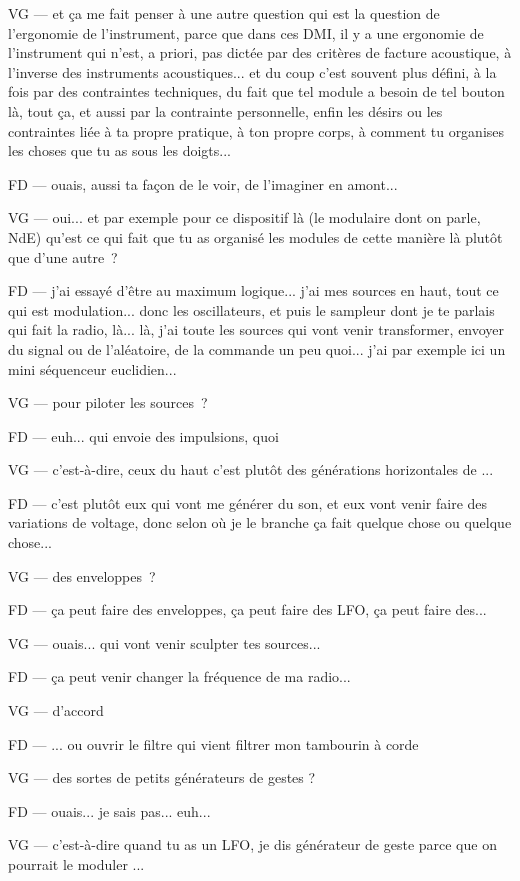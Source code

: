 VG — et ça me fait penser à une autre question qui est la question de l'ergonomie de l'instrument, parce que dans ces DMI, il y a une ergonomie de l'instrument qui n'est, a priori, pas dictée par des critères de facture acoustique, à l'inverse des instruments acoustiques... et du coup c'est souvent plus défini, à la fois par des contraintes techniques, du fait que tel module a besoin de tel bouton là, tout ça, et aussi par la contrainte personnelle, enfin les désirs ou les contraintes liée à ta propre pratique, à ton propre corps, à comment tu organises les choses que tu as sous les doigts... 

FD — ouais, aussi ta façon de le voir, de l'imaginer en amont... 

VG — oui... et par exemple pour ce dispositif là (le modulaire dont on parle, NdE) qu'est ce qui fait que tu as organisé les modules de cette manière là plutôt que d'une autre ? 

FD — j'ai essayé d'être au maximum logique... j'ai mes sources en haut, tout ce qui est modulation... donc les oscillateurs, et puis le sampleur dont je te parlais qui fait la radio, là... là, j'ai toute les sources qui vont venir transformer, envoyer du signal ou de l'aléatoire, de la commande un peu quoi... j'ai par exemple ici un mini séquenceur euclidien... 

VG — pour piloter les sources ? 

FD — euh... qui envoie des impulsions, quoi 

VG — c'est-à-dire, ceux du haut c'est plutôt des générations horizontales de ... 

FD — c'est plutôt eux qui vont me générer du son, et eux vont venir faire des variations de voltage, donc selon où je le branche ça fait quelque chose ou quelque chose... 

VG — des enveloppes ? 

FD — ça peut faire des enveloppes, ça peut faire des LFO, ça peut faire des...  

VG — ouais... qui vont venir sculpter tes sources... 

FD — ça peut venir changer la fréquence de ma radio... 

VG — d'accord 

FD — ... ou ouvrir le filtre qui vient filtrer mon tambourin à corde 

VG — des sortes de petits générateurs de gestes ?

FD — ouais... je sais pas... euh... 

VG — c'est-à-dire quand tu as un LFO, je dis générateur de geste parce que on pourrait le moduler ... 

